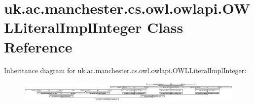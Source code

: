 \hypertarget{classuk_1_1ac_1_1manchester_1_1cs_1_1owl_1_1owlapi_1_1_o_w_l_literal_impl_integer}{\section{uk.\-ac.\-manchester.\-cs.\-owl.\-owlapi.\-O\-W\-L\-Literal\-Impl\-Integer Class Reference}
\label{classuk_1_1ac_1_1manchester_1_1cs_1_1owl_1_1owlapi_1_1_o_w_l_literal_impl_integer}
}
Inheritance diagram for uk.\-ac.\-manchester.\-cs.\-owl.\-owlapi.\-O\-W\-L\-Literal\-Impl\-Integer\-:\begin{figure}[H]
\begin{center}
\leavevmode
\includegraphics[height=1.028466cm]{classuk_1_1ac_1_1manchester_1_1cs_1_1owl_1_1owlapi_1_1_o_w_l_literal_impl_integer}
\end{center}
\end{figure}
